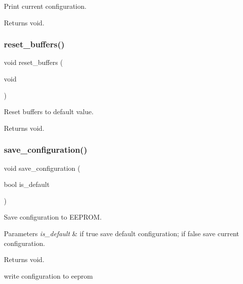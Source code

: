 Print current configuration. 

\begin{DoxyReturn}{Returns}
void. 
\end{DoxyReturn}
\mbox{\label{i2c-rain_8ino_a07daf3835b622d4d3451690f603845c1}} 
\subsubsection{\texorpdfstring{reset\+\_\+buffers()}{reset\_buffers()}}
{\footnotesize\ttfamily void reset\+\_\+buffers (\begin{DoxyParamCaption}\item[{void}]{ }\end{DoxyParamCaption})}



Reset buffers to default value. 

\begin{DoxyReturn}{Returns}
void. 
\end{DoxyReturn}
\mbox{\label{i2c-rain_8ino_afa979a8cb238fe81bf20654dfd6096ef}} 
\subsubsection{\texorpdfstring{save\+\_\+configuration()}{save\_configuration()}}
{\footnotesize\ttfamily void save\+\_\+configuration (\begin{DoxyParamCaption}\item[{bool}]{is\+\_\+default }\end{DoxyParamCaption})}



Save configuration to E\+E\+P\+R\+OM. 


\begin{DoxyParams}{Parameters}
{\em is\+\_\+default} & if true save default configuration; if false save current configuration. \\
\hline
\end{DoxyParams}
\begin{DoxyReturn}{Returns}
void. 
\end{DoxyReturn}
write configuration to eeprom \mbox{\label{i2c-rain_8ino_a4fc01d736fe50cf5b977f755b675f11d}} 
